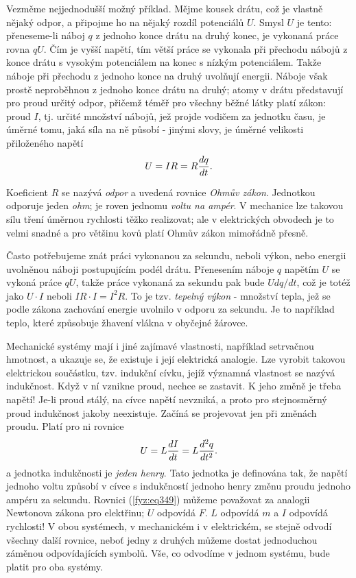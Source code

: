     Vezměme nejjednodušší možný příklad. Mějme kousek drátu, což je vlastně nějaký odpor, a 
    připojme ho na nějaký rozdíl potenciálů \(U\). Smysl \(U\) je tento: přeneseme-li náboj \(q\) z 
    jednoho konce drátu na druhý konec, je vykonaná práce rovna \(qU\). Čím je vyšší napětí, tím 
    větší práce se vykonala při přechodu nábojů z konce drátu s vysokým potenciálem na konec s 
    nízkým potenciálem. Takže náboje při přechodu z jednoho konce na druhý uvolňují energii. Náboje 
    však prostě neproběhnou z jednoho konce drátu na druhý; atomy v drátu představují pro proud 
    určitý odpor, přičemž téměř pro všechny běžné látky platí zákon: proud \(I\), tj. určité 
    množství nábojů, jež projde vodičem za jednotku času, je úměrné tomu, jaká síla na ně 
    působí - jinými slovy, je úměrné velikosti přiloženého napětí
    \begin{equation}\label{fyz:eq348}
      U = IR = R\dfrac{d q}{d t}.
    \end{equation}
    
    Koeficient \(R\) se nazývá \emph{odpor} a uvedená rovnice \emph{Ohmův zákon}. Jednotkou 
    odporuje jeden \emph{ohm}; je roven jednomu \emph{voltu na ampér}. V mechanice lze takovou sílu 
    tření úměrnou rychlosti těžko realizovat; ale v elektrických obvodech je to velmi snadné a pro 
    většinu kovů platí Ohmův zákon mimořádně přesně. 
    
    Často potřebujeme znát práci vykonanou za sekundu, neboli výkon, nebo energii uvolněnou náboji 
    postupujícím podél drátu. Přenesením náboje \(q\) napětím \(U\) se vykoná práce \(qU\), takže 
    práce vykonaná za sekundu pak bude \(Udq/dt\), což je totéž jako \(U\cdot I\) neboli \(IR\cdot 
    I=I^2R\). To je tzv. \emph{tepelný výkon} - množství tepla, jež se podle zákona zachování 
    energie uvolnilo v odporu za sekundu. Je to například teplo, které způsobuje žhavení vlákna v 
    obyčejné žárovce.
    
    Mechanické systémy mají i jiné zajímavé vlastnosti, například setrvačnou hmotnost, a ukazuje 
    se, že existuje i její elektrická analogie. Lze vyrobit takovou elektrickou součástku, tzv. 
    indukční cívku, jejíž významná vlastnost se nazývá indukčnost. Když v ní vznikne proud, nechce 
    se zastavit. K jeho změně je třeba napětí! Je-li proud stálý, na cívce napětí nevzniká, a proto 
    pro stejnosměrný proud indukčnost jakoby neexistuje. Začíná se projevovat jen při změnách 
    proudu. Platí pro ni rovnice
    \begin{equation}\label{fyz:eq349}
      U = L\dfrac{d I}{d t} = L\dfrac{d^2 q}{d t^2}.
    \end{equation}
    a jednotka indukčnosti je \emph{jeden henry}. Tato jednotka je definována tak, že napětí 
    jednoho voltu způsobí v cívce s indukčností jednoho henry změnu proudu jednoho ampéru za 
    sekundu. Rovnici (\ref{fyz:eq349}) můžeme považovat za analogii Newtonova zákona pro elektřinu; 
    \(U\) odpovídá \(F\). \(L\) odpovídá \(m\) a \(I\) odpovídá rychlosti! V obou systémech, v 
    mechanickém i v elektrickém, se stejně odvodí všechny další rovnice, neboť jedny z druhých 
    můžeme dostat jednoduchou záměnou odpovídajících symbolů. Vše, co odvodíme v jednom systému, 
    bude platit pro oba systémy.
    
